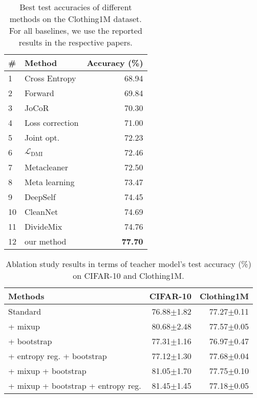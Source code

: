 \documentclass[conference]{IEEEtran}
\begin{document}
\begin{table}[!tb]
\caption{Best test accuracies of different methods on the Clothing1M dataset. For all baselines, we use the reported results in the respective papers.\\[-1.5em]}
\label{clothing reuslt}
\centering
\begin{tabular}{llr}  
\toprule
\# & Method   &  Accuracy (\%) \\
\midrule
1 & Cross Entropy \cite{tanaka2018joint} &  68.94 \\ 
2 & Forward \cite{patrini2017making}  &  69.84 \\
3 & JoCoR \cite{wei2020combating}  & 70.30 \\
4 & Loss correction \cite{arazo2019unsupervised}     & 71.00\\
5 & Joint opt. \cite{tanaka2018joint}   &    72.23 \\
6 & $\mathcal{L}_{\text{DMI}}$ \cite{xu2019l_dmi}  & 72.46 \\
7 & Metacleaner \cite{zhang2019metacleaner}  &   72.50 \\
8 & Meta learning\cite{li2019learning}  &   73.47 \\

9 & DeepSelf \cite{han2019deep}  &   74.45 \\
10 & CleanNet \cite{lee2018cleannet}  &   74.69 \\




11 & DivideMix\cite{li2020dividemix}  & 74.76 \\
\midrule
12 & our method  & \textbf{77.70} \\
\bottomrule
\end{tabular}
\end{table}


\begin{table}[!tb]
\caption{Ablation study results in terms of teacher model's test accuracy (\%) on CIFAR-10 and Clothing1M.\\[-1.5em]}
\label{ablation teacher}
\centering
\begin{tabular}{lrr}
\toprule
Methods  & CIFAR-10 & Clothing1M \\\midrule
Standard & 76.88$\pm$1.82   & 77.27$\pm$0.11  \\\midrule
+ mixup  & 80.68$\pm$2.48   & 77.57$\pm$0.05  \\\midrule
+ bootstrap    & 77.31$\pm$1.16   & 76.97$\pm$0.47 \\\midrule
+ entropy reg. + bootstrap & 77.12$\pm$1.30   & 77.68$\pm$0.04  \\\midrule
+ mixup + bootstrap    & 81.05$\pm$1.70   & 77.75$\pm$0.10 \\\midrule
+ mixup + bootstrap + entropy reg. & 81.45$\pm$1.45   &  77.18$\pm$0.05  \\
\bottomrule
\end{tabular}
\end{table}
\end{document}
